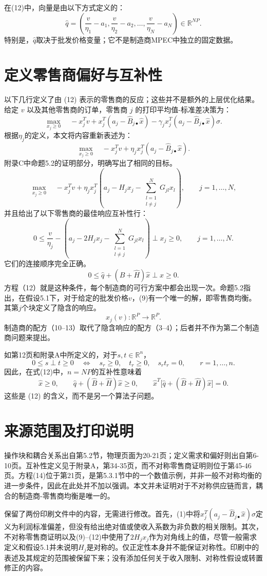 \documentclass{article}
\begin{document}
在(12)中，向量是由以下方式定义的：
\[
\hat{q}=\left(\frac{v}{\eta_1}-a_1,
\frac{v}{\eta_2}-a_2,\ldots,
\frac{v}{\eta_N}-a_N\right)\in\mathbb{R}^{NP}.
\]
特别是，$\hat{q}$取决于批发价格变量；它不是制造商MPEC中独立的固定数据。

\section*{定义零售商偏好与互补性}
以下几行定义了由 (12) 表示的零售商的反应；这些并不是额外的上层优化结果。给定 $v$ 以及其他零售商的订单，零售商 $j$ 的打印平均值-标准差决策为：
\begin{equation}
\max_{x_j\geq0}\quad
-x_j^T v+x_j^T(a_j-\hat{B}_{j\bullet}\hat{x})
-\gamma_jx_j^T(a_j-\hat{B}_{j\bullet}\hat{x})\sigma.
\tag{1}
\end{equation}
根据$\eta_j$的定义，本文将内容重新表述为：
\begin{equation}
\max_{x_j\geq0}\quad
-x_j^T v+\eta_jx_j^T(a_j-\hat{B}_{j\bullet}\hat{x}).
\tag{2}
\end{equation}
附录C中命题5.2的证明部分，明确写出了相同的目标。
\[
\max_{x_j\geq0}\quad
-x_j^T v+\eta_jx_j^T
\left(a_j-H_jx_j-\sum_{\substack{l=1\\l\ne j}}^{N}G_{jl}x_l\right),
\qquad j=1,\ldots,N,
\]
并且给出了以下零售商的最佳响应互补性行：
\[
0\leq\frac{v}{\eta_j}
-\left(a_j-2H_jx_j-\sum_{\substack{l=1\\l\ne j}}^{N}G_{jl}x_l\right)
\perp x_j\geq0,
\qquad j=1,\ldots,N.
\]
它们的连接顺序完全正确。
\begin{equation}
0\leq\hat{q}+(\hat{B}+\hat{H})\hat{x}
\perp\hat{x}\geq0.
\tag{9}
\end{equation}
方程（12）就是这种条件，每个制造商的可行方案中都会出现一次。命题5.2指出，在假设5.1下，对于给定的批发价格$v$，(9)有一个唯一的解，即零售商均衡。其第$j$个块定义了隐含的响应。
\[
x_j(v):\mathbb{R}^{P}\longrightarrow\mathbb{R}^{P}.
\]
制造商的配方（10–13）取代了隐含响应的配方（3–4）；后者并不作为第二个制造商问题来提出。

如第12页和附录A中所定义的，对于$s,t\in\mathbb{R}^{n}$，
\[
0\leq s\perp t\geq0
\quad\Longleftrightarrow\quad
s_r\geq0,\quad t_r\geq0,\quad s_rt_r=0,
\qquad r=1,\ldots,n.
\]
因此，在式(12)中，$n=NP$的互补性意味着
\[
\hat{x}\geq0,\qquad
\hat{q}+(\hat{B}+\hat{H})\hat{x}\geq0,\qquad
\hat{x}^{T}\bigl[\hat{q}+(\hat{B}+\hat{H})\hat{x}\bigr]=0.
\]
这些是 (12) 的含义，而不是另一个算法子问题。

\section*{来源范围及打印说明}
操作块和耦合关系出自第5.2节，物理页面为20-21页；定义需求和偏好则出自第6-10页。互补性定义见于附录A，第34-35页，而不对称零售商证明则位于第45-46页。方程(14)位于第21页，是第5.3.1节中的一个数值示例，并非一般不对称均衡的进一步条件，因此在此处并不加以强调。本文并未证明对于不对称供应链而言，耦合的制造商-零售商均衡是唯一的。

保留了两份印刷文件中的内容，无需进行修改。首先，(1)中将$x_j^T(a_j-\hat{B}_{j\bullet}\hat{x})\sigma$定义为利润标准偏差，但没有给出绝对值或使收入系数为非负数的相关限制。其次，不对称零售商证明以及(9)--(12)中使用了$2H_jx_j$作为对角线上的值，尽管一般需求定义和假设5.1并未说明$H_j$是对称的。仅正定性本身并不能保证对称性。印刷中的表述及其规定的范围被保留下来；没有添加任何关于收入限制、对称性假设或转置修正的内容。
\end{document}

